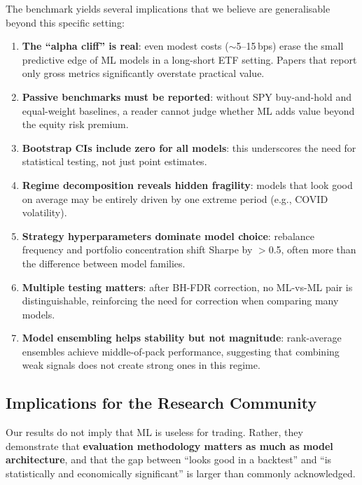 \documentclass[11pt]{article}
\begin{document}
The benchmark yields several implications that we believe are generalisable beyond this specific setting:

\begin{enumerate}[leftmargin=1.6em]
  \item \textbf{The ``alpha cliff'' is real}: even modest costs ($\sim$5--15\,bps) erase the small predictive edge of ML models in a long-short ETF setting. Papers that report only gross metrics significantly overstate practical value.

  \item \textbf{Passive benchmarks must be reported}: without SPY buy-and-hold and equal-weight baselines, a reader cannot judge whether ML adds value beyond the equity risk premium.

  \item \textbf{Bootstrap CIs include zero for all models}: this underscores the need for statistical testing, not just point estimates.

  \item \textbf{Regime decomposition reveals hidden fragility}: models that look good on average may be entirely driven by one extreme period (e.g., COVID volatility).

  \item \textbf{Strategy hyperparameters dominate model choice}: rebalance frequency and portfolio concentration shift Sharpe by $>$0.5, often more than the difference between model families.

  \item \textbf{Multiple testing matters}: after BH-FDR correction, no ML-vs-ML pair is distinguishable, reinforcing the need for correction when comparing many models.

  \item \textbf{Model ensembling helps stability but not magnitude}: rank-average ensembles achieve middle-of-pack performance, suggesting that combining weak signals does not create strong ones in this regime.
\end{enumerate}

\subsection{Implications for the Research Community}

Our results do not imply that ML is useless for trading.
Rather, they demonstrate that \textbf{evaluation methodology matters as much as model architecture}, and that the gap between ``looks good in a backtest'' and ``is statistically and economically significant'' is larger than commonly acknowledged.
\end{document}
